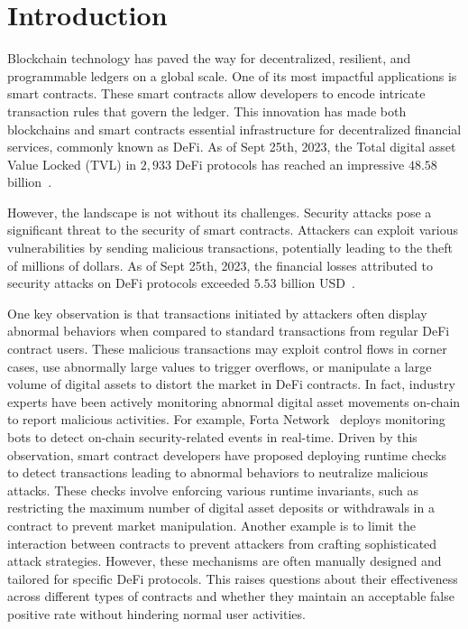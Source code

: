 \vspace{-2ex}
\section{Introduction}
\vspace{-1ex}

Blockchain technology has paved the way for decentralized, resilient, and
programmable ledgers on a global scale. One of its most impactful applications
is smart contracts. These smart
contracts allow developers to encode intricate transaction rules that govern
the ledger. This innovation has made both blockchains and smart contracts
essential infrastructure for decentralized financial services,
commonly known as DeFi. As of Sept 25th, 2023, the Total digital asset Value Locked (TVL) in
$2,933$ DeFi protocols has reached an impressive $48.58$
billion~\cite{defillama2}.

However, the landscape is not without its challenges. Security attacks pose a
significant threat to the security of smart contracts. Attackers can exploit
various vulnerabilities by sending malicious transactions, potentially leading
to the theft of millions of dollars. As of Sept 25th, 2023, the financial
losses attributed to security attacks on DeFi protocols exceeded $5.53$ billion
USD~\cite{defillama}.

One key observation is that transactions initiated by attackers often display
abnormal behaviors when compared to standard transactions from regular DeFi
contract users. These malicious transactions may exploit control flows in
corner cases, use abnormally large values to trigger overflows, or manipulate a
large volume of digital assets to distort the market in DeFi contracts. In
fact, industry experts have been actively monitoring abnormal digital asset
movements on-chain to report malicious activities. For example, Forta Network~\cite{Forta}
deploys monitoring bots to detect on-chain security-related events in real-time. 
Driven by this observation, smart contract developers have proposed deploying
runtime checks to detect transactions leading to abnormal behaviors to neutralize
malicious attacks. These checks involve enforcing various runtime invariants,
such as restricting the maximum number of digital asset deposits or withdrawals
in a contract to prevent market manipulation. Another example is to limit the
interaction between contracts to prevent attackers from crafting sophisticated
attack strategies. However, these mechanisms are often manually designed and
tailored for specific DeFi protocols. This raises questions about their
effectiveness across different types of contracts and whether they maintain an
acceptable false positive rate without hindering normal user activities.

